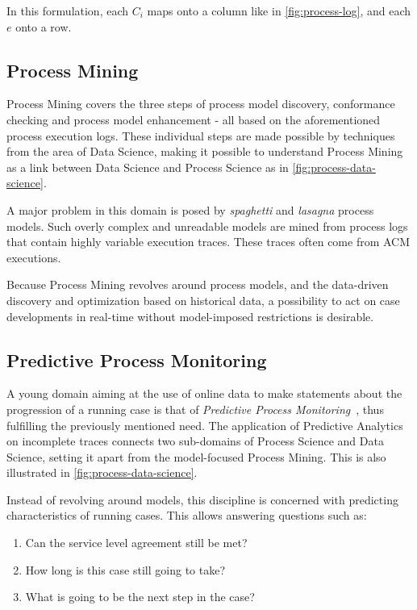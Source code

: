 In this formulation, each $C_i$ maps onto a column like in \autoref{fig:process-log}, and each $e$ onto a row.

\subsection{Process Mining}\label{sec:process-mining}
Process Mining covers the three steps of process model discovery, conformance checking and process model enhancement \cite{Aalst2016} -  all based on the aforementioned process execution logs. These individual steps are made possible by techniques from the area of Data Science, making it possible to understand Process Mining as a link between Data Science and Process Science as in \autoref{fig:process-data-science}.

A major problem in this domain is posed by \textit{spaghetti} and \textit{lasagna} process models\cite{Aalst2016}. Such overly complex and unreadable models are mined from process logs that contain highly variable execution traces. These traces often come from ACM executions.

Because Process Mining revolves around process models, and the data-driven discovery and optimization based on historical data, a possibility to act on case developments in real-time without model-imposed restrictions is desirable.

\subsection{Predictive Process Monitoring}
\label{sec:predictive-process-monitoring}
A young domain aiming at the use of online data to make statements about the progression of a running case is that of \textit{Predictive Process Monitoring}~\cite{francescomarino2015, schoenig2018}, thus fulfilling the previously mentioned need. The application of Predictive Analytics on incomplete traces connects two sub-domains of Process Science and Data Science, setting it apart from the model-focused Process Mining. This is also illustrated in \autoref{fig:process-data-science}.

Instead of revolving around models, this discipline is concerned with predicting characteristics of running cases. This allows answering questions such as:

\begin{enumerate}
    \item Can the service level agreement still be met?
    \item How long is this case still going to take?
    \item What is going to be the next step in the case?
\end{enumerate}

